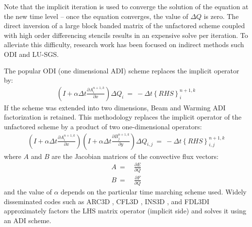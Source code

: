 \documentclass[conf]{new-aiaa}
\begin{document}


Note that the implicit iteration is used to converge the solution of the equation at the new time level – once the equation converges, the value of $\Delta{Q}$ is zero. 
The direct inversion of a large block banded matrix of the unfactored scheme coupled with high order differencing stencils results in an expensive solve per iteration. 
To alleviate this difficulty, research work has been focused on indirect methods such ODI and LU-SGS. 

The popular ODI (one dimensional ADI) scheme replaces the implicit operator by: 
\begin{equation}
	\begin{split}
		\label{eq:TriDi}
  			\left(I+\alpha\Delta{t}\frac{\partial{A_i^{n+1,k}}}{\partial{x}}\right)\Delta{Q}_i~=~-\Delta{t}\left\{RHS\right\}_i^{n+1, k}
	\end{split}
\end{equation}
If the scheme was extended into two dimensions, Beam and Warming \cite{Beam} ADI factorization is retained. This methodology replaces the implicit operator of the unfactored scheme by a product of two one-dimensional operators: 
\begin{equation}
	\begin{split}
		\label{eq:ADI}
  			\left(I+\alpha\Delta{t}\frac{\partial{A_i^{n+1,k}}}{\partial{x}}\right)\left(I+\alpha\Delta{t}\frac{\partial{B_j^{n+1,k}}}{\partial{y}}\right)\Delta{Q}_{i,j}~=~-\Delta{t}\left\{RHS\right\}_{i,j}^{n+1, k}
	\end{split}
\end{equation}
where $A$ and $B$ are the Jacobian matrices of the convective flux vectors:
\begin{equation}
	\begin{split}
		\label{eq:}
  			A~=&~\frac{\partial{E}}{\partial{Q}} \\
  			B~=&~\frac{\partial{F}}{\partial{Q}}
	\end{split}
\end{equation}
and the value of $\alpha$ depends on the particular time marching scheme used. Widely disseminated codes such as ARC3D \cite{ARC3D}, CFL3D \cite{CFL3D}, INS3D \cite{INS3D}, and FDL3DI \cite{FDL3DI_A, FDL3DI_B, FDL3DI_C} approximately factors the LHS matrix operator (implicit side) and solves it using an ADI scheme. 
\end{document}
